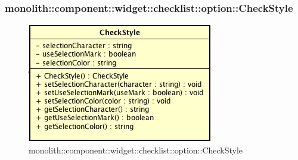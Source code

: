 \subsubsection{monolith::component::widget::checklist::option::CheckStyle}

\label{monolith::component::widget::checklist::option::CheckStyle}
\begin{figure}[ht]
	\centering
	\includegraphics[scale=0.5]{Sezioni/SottosezioniST/img/CheckStyle.png}
	\caption{monolith::component::widget::checklist::option::CheckStyle}
\end{figure}

